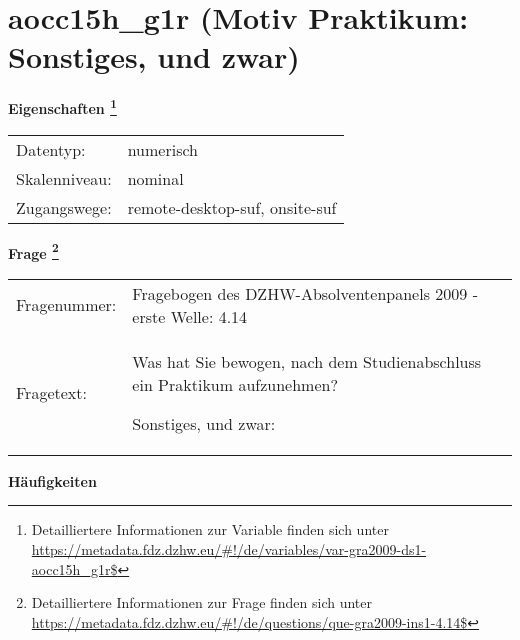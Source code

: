 
    \setcounter{footnote}{0}

    \vspace*{-1.8cm}
	\section{aocc15h\_g1r (Motiv Praktikum: Sonstiges, und zwar)}
	\label{section:aocc15h_g1r}



    \vspace*{0.5cm}
    \noindent\textbf{Eigenschaften
	\footnote{Detailliertere Informationen zur Variable finden sich unter
		\url{https://metadata.fdz.dzhw.eu/\#!/de/variables/var-gra2009-ds1-aocc15h_g1r$}}}\\
	\begin{tabularx}{\hsize}{@{}lX}
	Datentyp: & numerisch \\
	Skalenniveau: & nominal \\
	Zugangswege: &
	  remote-desktop-suf, 
	  onsite-suf
 \\
    \end{tabularx}



				\vspace*{0.5cm}
                \noindent\textbf{Frage
	                \footnote{Detailliertere Informationen zur Frage finden sich unter
		              \url{https://metadata.fdz.dzhw.eu/\#!/de/questions/que-gra2009-ins1-4.14$}}}\\
				\begin{tabularx}{\hsize}{@{}lX}
					Fragenummer: &
					  Fragebogen des DZHW-Absolventenpanels 2009 - erste Welle:
					  4.14
 \\
					Fragetext: & Was hat Sie bewogen, nach dem Studienabschluss ein Praktikum aufzunehmen?\par  Sonstiges, und zwar: \\
				\end{tabularx}





        		\vspace*{0.5cm}
                \noindent\textbf{Häufigkeiten}

